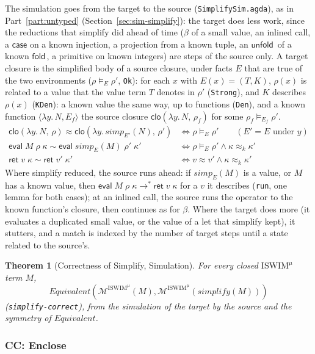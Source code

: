 \documentclass[10pt]{article}
\theoremstyle{acmplain}
\newtheorem{theorem}{Theorem}[section]
\newcommand{\key}[1]{\mathsf{#1}}
\newcommand{\pass}[1]{\mathit{#1}}
\newcommand{\lam}[1]{\lambda #1.\,}
\newcommand{\ev}[3]{\key{eval}\;#1\;#2\;#3}
\newcommand{\rt}[2]{\key{ret}\;#1\;#2}
\newcommand{\Mach}[1]{\mathcal{M}^{#1}}
\newcommand{\Equiv}{\mathit{Equivalent}}
\newcommand{\cloV}[2]{\key{clo}(#1,\, #2)}
\newcommand{\lto}{\longrightarrow}
\newcommand{\approxk}{\approx_k}
\newcommand{\Ml}[1]{\textrm{#1}^{\mu}}                  %
\newcommand{\Mfold}{\key{fold}\,}
\newcommand{\Munfold}{\key{unfold}\,}
\begin{document}
The simulation goes from the target to the source (\texttt{SimplifySim.agda}),
as in Part~\ref{part:untyped} (Section~\ref{sec:sim-simplify}): the target
does less work, since the reductions that simplify did ahead of time ($\beta$
of a small value, an inlined call, a $\key{case}$ on a known injection, a
projection from a known tuple, an $\Munfold$ of a known $\Mfold$, a
primitive on known integers) are steps of the source only. A target
closure is the simplified body of a source closure, under facts $E$ that
are true of the two environments ($\rho \models_E \rho'$, \texttt{Ok}): for
each $x$ with $E(x) = (T, K)$, $\rho(x)$ is related to a value that the
value term $T$ denotes in $\rho'$ (\texttt{Strong}), and $K$ describes
$\rho(x)$ (\texttt{KDen}): a known value the same way, up to functions
(\texttt{Den}), and a known function $\langle \lam{y} N, E_f \rangle$ the
source closure $\cloV{\lam{y} N}{\rho_f}$ for some $\rho_f \models_{E_f} \rho'$.
\begin{align*}
  \cloV{\lam{y} N}{\rho} \approx \cloV{\lam{y} \pass{simp}_{E'}(N)}{\rho'}
    &\iff \rho \models_E \rho' \qquad (E' = E \text{ under } y) \\
  \ev{M}{\rho}{\kappa} \sim \ev{\pass{simp}_E(M)}{\rho'}{\kappa'}
    &\iff \rho \models_E \rho' \land \kappa \approxk \kappa' \\
  \rt{v}{\kappa} \sim \rt{v'}{\kappa'} &\iff v \approx v' \land \kappa \approxk \kappa'
\end{align*}
Where simplify reduced, the source runs ahead: if $\pass{simp}_E(M)$ is a
value, or $M$ has a known value, then $\ev{M}{\rho}{\kappa} \lto^*
\rt{v}{\kappa}$ for a $v$ it describes (\texttt{run}, one lemma for
both cases); at an inlined call, the source runs the operator to
the known function's closure, then continues as for $\beta$. Where the
target does more (it evaluates a duplicated small value, or the value of
a let that simplify kept), it stutters, and a match is indexed by the
number of target steps until a state related to the source's.
\begin{theorem}[Correctness of Simplify, Simulation]\label{thm:m-cek-simplify}
For every closed $\Ml{ISWIM}$ term $M$,
\[ \Equiv(\Mach{\Ml{ISWIM}}(M), \Mach{\Ml{ISWIM}}(\pass{simplify}(M))) \]
(\texttt{simplify-correct}), from the simulation of the target by the
source and the symmetry of $\Equiv$.
\end{theorem}

\subsubsection{CC: Enclose}
\end{document}
